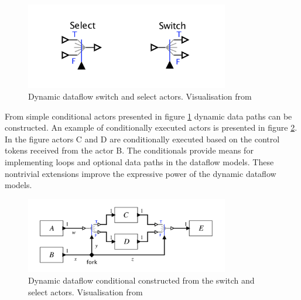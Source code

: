 \documentclass[conference,a4paper]{IEEEtran}
\begin{document}
\begin{figure}[!t]
    \centering
        \includegraphics[width=21pc]{ddf_actors.png}
        \caption{Dynamic dataflow switch and select actors. Visualisation from
        \cite{lee2015introduction}}
        \label{fig:actors1}
\end{figure}

From simple conditional actors presented in figure \ref{fig:actors1} dynamic
data paths can be constructed. An example of conditionally executed actors is
presented in figure \ref{fig:conditional}. In the figure actors C and D are
conditionally executed based on the control tokens received from the actor B.
The conditionals provide means for implementing loops and optional data paths in
the dataflow models. These nontrivial extensions improve the expressive power
of the dynamic dataflow models.

\begin{figure}[!t]
    \centering
        \includegraphics[width=21pc]{ddf_conditional.png}
        \caption{Dynamic dataflow conditional constructed from the switch and
        select actors. Visualisation from \cite{lee2015introduction}}
        \label{fig:conditional}
\end{figure}
\end{document}
